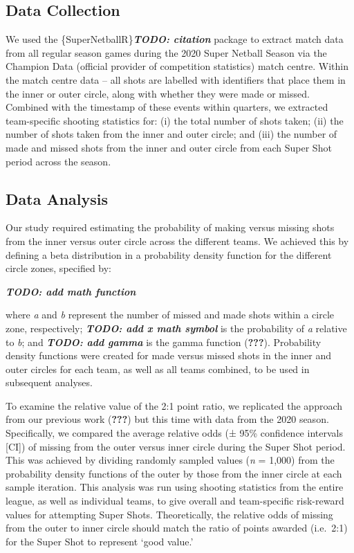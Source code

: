 \documentclass[]{elsarticle} %
\begin{document}
\hypertarget{data-collection}{%
\subsection{Data Collection}\label{data-collection}}

We used the \{SuperNetballR\}\textbf{\emph{TODO: citation}} package to
extract match data from all regular season games during the 2020 Super
Netball Season via the Champion Data (official provider of competition
statistics) match centre. Within the match centre data -- all shots are
labelled with identifiers that place them in the inner or outer circle,
along with whether they were made or missed. Combined with the timestamp
of these events within quarters, we extracted team-specific shooting
statistics for: (i) the total number of shots taken; (ii) the number of
shots taken from the inner and outer circle; and (iii) the number of
made and missed shots from the inner and outer circle from each Super
Shot period across the season.

\hypertarget{data-analysis}{%
\subsection{Data Analysis}\label{data-analysis}}

Our study required estimating the probability of making versus missing
shots from the inner versus outer circle across the different teams. We
achieved this by defining a beta distribution in a probability density
function for the different circle zones, specified by:

\textbf{\emph{TODO: add math function}}

where \emph{a} and \emph{b} represent the number of missed and made
shots within a circle zone, respectively; \textbf{\emph{TODO: add x math
symbol}} is the probability of \emph{a} relative to \emph{b}; and
\textbf{\emph{TODO: add gamma}} is the gamma function ({\textbf{???}}).
Probability density functions were created for made versus missed shots
in the inner and outer circles for each team, as well as all teams
combined, to be used in subsequent analyses.

To examine the relative value of the 2:1 point ratio, we replicated the
approach from our previous work ({\textbf{???}}) but this time with data
from the 2020 season. Specifically, we compared the average relative
odds (± 95\% confidence intervals {[}CI{]}) of missing from the outer
versus inner circle during the Super Shot period. This was achieved by
dividing randomly sampled values (\emph{n} = 1,000) from the probability
density functions of the outer by those from the inner circle at each
sample iteration. This analysis was run using shooting statistics from
the entire league, as well as individual teams, to give overall and
team-specific risk-reward values for attempting Super Shots.
Theoretically, the relative odds of missing from the outer to inner
circle should match the ratio of points awarded (i.e.~2:1) for the Super
Shot to represent `good value.'
\end{document}
